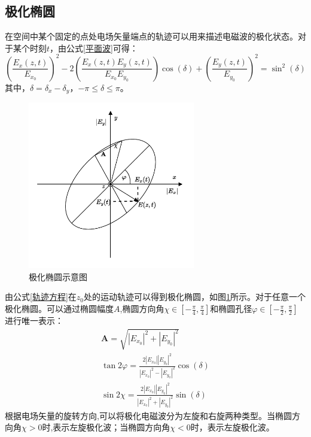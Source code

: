 \subsection{极化椭圆}
在空间中某个固定的点处电场矢量端点的轨迹可以用来描述电磁波的极化状态。对于某个时刻$t$，由公式\eqref{平面波}可得：
\begin{equation}
  \label{轨迹方程}
  \left(\frac{E_x(z, t)}{E_{x_0}}\right)^2-2\left(\frac{E_x(z, t) E_y(z, t)}{E_{x_0} E_{y_0}}\right) \cos (\delta)+\left(\frac{E_y(z, t)}{E_{y_0}}\right)^2=\sin ^2(\delta)
\end{equation}
其中，$\delta=\delta_x-\delta_y$，$-\pi \leqslant \delta \leqslant \pi$。

\begin{figure}[h]
  \includegraphics[width=7.3cm]{pic/chapter2/极化椭圆示意图.pdf}
  \caption{极化椭圆示意图}
  \label{极化椭圆示意图}
\end{figure}

由公式\eqref{轨迹方程}在$z_0$处的运动轨迹可以得到极化椭圆，如图\ref{极化椭圆示意图}所示。对于任意一个极化椭圆。可以通过椭圆幅度$A$,椭圆方向角$\chi \in [-\frac{\pi}{4}, \frac{\pi}{4}]$和椭圆孔径$\varphi \in [-\frac{\pi}{2}, \frac{\pi}{2}]$进行唯一表示：
\begin{gather}
  \mathbf{A}=\sqrt{\left|E_{x_0}\right|^2+\left|E_{y_0}\right|^2}                                                                \\
  \tan 2 \varphi=\frac{2\left|E_{x_0}\right|\left|E_{y_0}\right|^2}{\left|E_{x_0}\right|^2-\left|E_{y_0}\right|^2} \cos (\delta) \\
  \sin 2 \chi=\frac{2\left|E_{x_0}\right|\left|E_{y_0}\right|^2}{\left|E_{x_0}\right|^2+\left|E_{y_0}\right|^2} \sin (\delta)
\end{gather}
根据电场矢量的旋转方向,可以将极化电磁波分为左旋和右旋两种类型。当椭圆方向角$\chi > 0$时,表示左旋极化波；当椭圆方向角$\chi < 0$时，表示左旋极化波。
